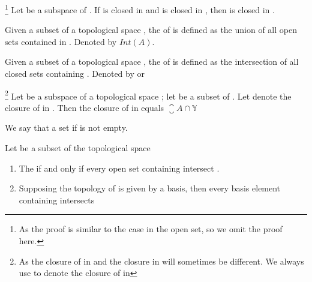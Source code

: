 \begin{theorem}\footnote{
      As the proof is similar to the case in the open set, so we omit the proof here.
}
      Let  be a subspace of . If  is closed in  and  is closed in , then  is closed in .
\end{theorem}

\begin{definition}[interior]\label{def:Interior}
      Given a subset  of a topological space , the  of  is defined as the union of all open sets contained in . Denoted by $ Int(A) $.
\end{definition}

\begin{definition}[closure]\label{def:Closure}
      Given a subset  of a topological space , the  of  is defined as the intersection of all closed sets containing . Denoted by  or 
\end{definition}

\begin{theorem}\omitObviuos\footnote{
      As the closure of  in  and the closure  in  will sometimes be different. We always use  to denote the closure of  in 
}
      Let  be a subspace of a topological space ; let  be a subset of . Let  denote the closure of  in . Then the closure of  in  equals $ \closure{A} \cap \mathbb{Y} $
\end{theorem}

\begin{definition}[intersect]\label{def:Intersect}
      We say that a set    if  is not empty.
\end{definition}

\begin{theorem}
      Let  be a subset of the topological space 
      \begin{enumerate}
            \item The  if and only if every open set  containing  intersect .
            \item Supposing the topology of  is given by a basis, then  \ioi every basis element  containing  intersects 
      \end{enumerate}
\end{theorem}

